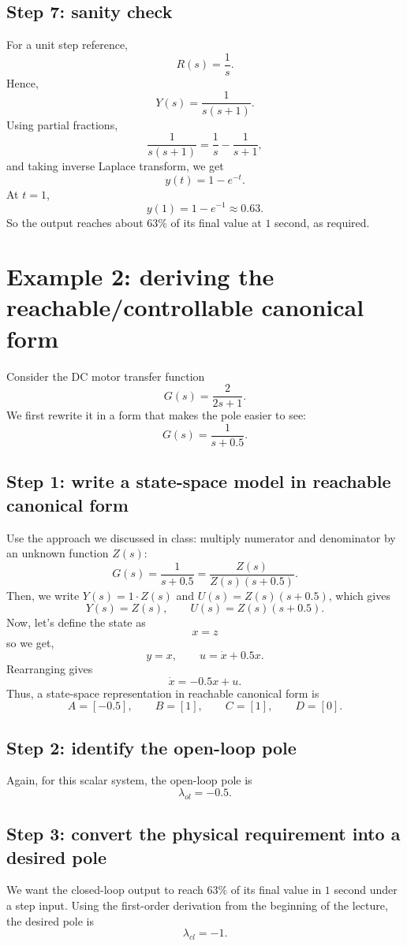 \documentclass{ee122_notes}
\begin{document}
\subsection*{Step 7: sanity check}

For a unit step reference,
\[
R(s)=\frac{1}{s}.
\]
Hence,
\[
Y(s)=\frac{1}{s(s+1)}.
\]
Using partial fractions,
\[
\frac{1}{s(s+1)}=\frac{1}{s}-\frac{1}{s+1},
\]
and taking inverse Laplace transform, we get
\[
y(t)=1-e^{-t}.
\]
At \(t=1\),
\[
y(1)=1-e^{-1}\approx 0.63.
\]
So the output reaches about \(63\%\) of its final value at \(1\) second, as required.

\section{Example 2: deriving the reachable/controllable canonical form}

Consider the DC motor transfer function
\[
G(s)=\frac{2}{2s+1}.
\]
We first rewrite it in a form that makes the pole easier to see:
\[
G(s)=\frac{1}{s+0.5}.
\]

\subsection*{Step 1: write a state-space model in reachable canonical form}
Use the approach we discussed in class: multiply numerator and denominator by an unknown function \(Z(s)\):
\[
G(s)=\frac{1}{s+0.5}=\frac{Z(s
)}{Z(s)(s+0.5)}.
\]
Then, we write $Y(s) = 1 \cdot Z(s)$ and $U(s) = Z(s)(s+0.5)$, which gives
\[
Y(s)=Z(s),
\qquad
U(s)=Z(s)(s+0.5).
\]
Now, let's define the state as
\[
x=z
\]
so we get,
\[
y = x,
\qquad
u = \dot x + 0.5 x.
\]
Rearranging gives
\[
\dot x = -0.5 x + u.
\]
Thus, a state-space representation in reachable canonical form is
\[
A=[-0.5],
\qquad
B=[1],
\qquad
C=[1],
\qquad
D=[0].
\]

\subsection*{Step 2: identify the open-loop pole}

Again, for this scalar system, the open-loop pole is
\[
\lambda_{ol}=-0.5.
\]

\subsection*{Step 3: convert the physical requirement into a desired pole}

We want the closed-loop output to reach \(63\%\) of its final value in \(1\) second under a step input. Using the first-order derivation from the beginning of the lecture, the desired pole is
\[
\lambda_{cl}=-1.
\]
\end{document}
